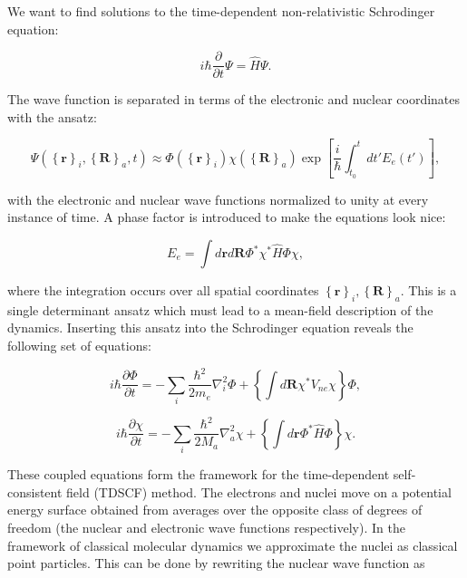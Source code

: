 We want to find solutions to the time-dependent non-relativistic
Schrodinger equation:

\begin{equation}
 i\hbar \frac{\partial}{\partial t} \Psi = \hat{H} \Psi . 
\end{equation}

The wave function is separated in terms of the electronic and nuclear
coordinates with the ansatz:

\begin{equation}
 \Psi \left(\left\{\bm{r}\right\}_i, \left\{\bm{R}\right\}_a, t \right)
    \approx \Phi(\left\{\bm{r}\right\}_i) \chi(\left\{\bm{R}\right\}_a)
    \exp \left[ \frac{i}{\hbar} \int_{t_0}^t
    dt' E_e(t') \right] ,
\end{equation}

with the electronic and nuclear wave functions normalized to unity
at every instance of time. A phase factor is introduced to make
the equations look nice:

\begin{equation}
 E_e = \int d\bm{r} d\bm{R} \Phi^* \chi^* \hat{H} \Phi \chi , 
\end{equation}

where the integration occurs over all spatial coordinates
$\left\{\bm{r}\right\}_i, \left\{\bm{R}\right\}_a$. This is a single determinant
ansatz which must lead to a mean-field description of the dynamics.
Inserting this ansatz into the Schrodinger equation
reveals the following set of equations:

\begin{equation}
 i\hbar \frac{\partial \Phi}{\partial t}
    = -\sum_i \frac{\hbar^2}{2m_e} \nabla_i^2 \Phi
    + \left\{ \int d\bm{R} \chi^* V_{ne} \chi \right\} \Phi , 
\end{equation}

\begin{equation}
 i\hbar \frac{\partial \chi}{\partial t}
    = -\sum_i \frac{\hbar^2}{2M_a} \nabla_a^2 \chi
    + \left\{ \int d\bm{r} \Phi^* \hat{H} \Phi \right\} \chi . 
\end{equation}

These coupled equations form the framework for the
time-dependent self-consistent field (TDSCF) method.
The electrons and nuclei move on a potential energy surface
obtained from averages over the opposite class of
degrees of freedom (the nuclear and electronic wave functions
respectively).
In the framework of classical molecular dynamics
we approximate the nuclei as classical point particles.
This can be done by rewriting the nuclear wave function as

